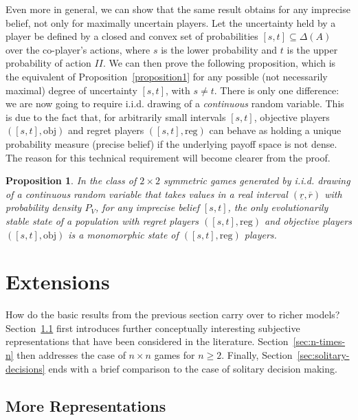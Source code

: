 \documentclass[fleqn,reqno,12pt]{article}
\theoremstyle{Satz}
\newtheorem{proposition}{Proposition}
\theoremstyle{Bsp}
\begin{document}
Even more in general, we can show that the same result obtains for any imprecise belief, not only for maximally uncertain players. 
Let the uncertainty held by a player be defined by a closed and convex set of probabilities $ [s,t] \subseteq \Delta(A) $ over the co-player's actions, where $s$ is the lower probability and $t$ is the upper probability of action $II$.
We can then prove the following proposition, which
is the equivalent of Proposition~\ref{proposition1} for any possible (not necessarily
maximal) degree of uncertainty $[s,t]$, with $s \neq t$. There is only one difference: we are
now going to require i.i.d. drawing of a \emph{continuous} random variable. This is due
to the fact that, for arbitrarily small intervals $[s,t]$, objective players $([s,t],\text{obj})$
and regret players $([s,t],\text{reg})$ can behave as holding a unique probability measure
(precise belief) if the underlying payoff space is not dense. The reason for this technical requirement
will become clearer from the proof.

\begin{proposition} \label{proposition2}
In the class of $2\times2$ symmetric games generated by i.i.d. drawing
of a continuous random variable that takes values in a real interval
$(\underline{r},\overline{r})$ with probability density $P_V$, for
any imprecise belief $[s,t]$, the only
evolutionarily stable state of a population with regret players $([s,t],\text{reg})$
and objective players $([s,t],\text{obj})$ is a monomorphic state of $([s,t],\text{reg})$
players.
\end{proposition}



\section{Extensions}
\label{sec:extensions}

How do the basic results from the previous section carry over to richer models?
Section~\ref{sec:more-types} first introduces further conceptually interesting subjective representations
that have been considered in the literature. Section~\ref{sec:n-times-n} then addresses the
case of $n \times n$ games for $n \ge 2$. Finally, Section~\ref{sec:solitary-decisions} ends
with a brief comparison to the case of solitary decision making.

\subsection{More Representations}
\label{sec:more-types}
\end{document}
